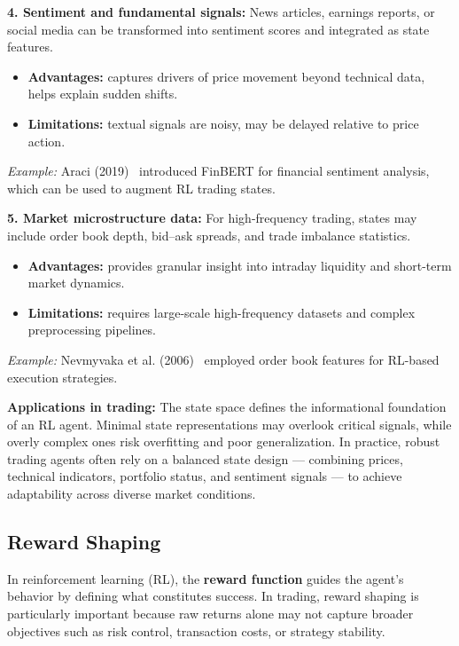 \documentclass[12pt,a4paper]{report}
\begin{document}
\bigskip
\textbf{4. Sentiment and fundamental signals:}  
News articles, earnings reports, or social media can be transformed into sentiment scores and integrated as state features.  
\begin{itemize}
    \item \textbf{Advantages:} captures drivers of price movement beyond technical data, helps explain sudden shifts.
    \item \textbf{Limitations:} textual signals are noisy, may be delayed relative to price action.
\end{itemize}
\textit{Example:} Araci (2019)~\cite{araci2019finbert} introduced FinBERT for financial sentiment analysis, which can be used to augment RL trading states.

\bigskip
\textbf{5. Market microstructure data:}  
For high-frequency trading, states may include order book depth, bid–ask spreads, and trade imbalance statistics.  
\begin{itemize}
    \item \textbf{Advantages:} provides granular insight into intraday liquidity and short-term market dynamics.
    \item \textbf{Limitations:} requires large-scale high-frequency datasets and complex preprocessing pipelines.
\end{itemize}
\textit{Example:} Nevmyvaka et al. (2006)~\cite{nevmyvaka2006reinforcement} employed order book features for RL-based execution strategies.

\bigskip
\textbf{Applications in trading:}  
The state space defines the informational foundation of an RL agent. Minimal state representations may overlook critical signals, while overly complex ones risk overfitting and poor generalization. In practice, robust trading agents often rely on a balanced state design — combining prices, technical indicators, portfolio status, and sentiment signals — to achieve adaptability across diverse market conditions.

\subsection{Reward Shaping}

In reinforcement learning (RL), the \textbf{reward function} guides the agent’s behavior by defining what constitutes success. In trading, reward shaping is particularly important because raw returns alone may not capture broader objectives such as risk control, transaction costs, or strategy stability.
\end{document}
